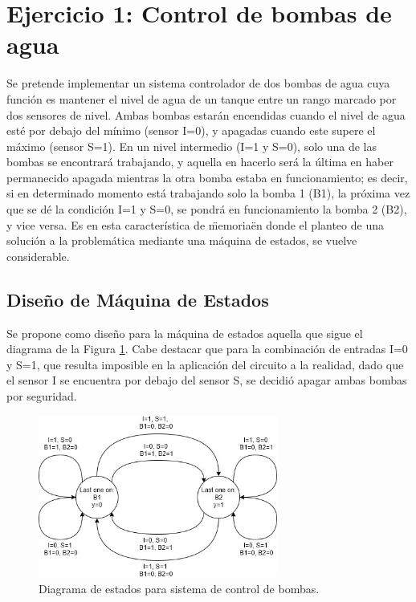 \section{Ejercicio 1: Control de bombas de agua}
Se pretende implementar un sistema controlador de dos bombas de agua cuya función es mantener el nivel de agua de un tanque entre un rango marcado por dos 
sensores de nivel.
Ambas bombas estarán encendidas cuando el nivel de agua esté por debajo del mínimo (sensor I=0), y apagadas cuando este supere el máximo (sensor S=1).
En un nivel intermedio (I=1 y S=0), solo una de las bombas se encontrará trabajando, y aquella en hacerlo será la última en haber permanecido apagada mientras la otra 
bomba estaba en funcionamiento; es decir, si en determinado momento está trabajando solo la bomba 1 (B1), la próxima vez que se dé la condición I=1 y S=0, se pondrá en 
funcionamiento la bomba 2 (B2), y vice versa.
Es en esta característica de \"memoria\" en donde el planteo de una solución a la problemática mediante una máquina de estados, se vuelve considerable.



\subsection{Diseño de Máquina de Estados}
Se propone como diseño para la máquina de estados aquella que sigue el diagrama de la Figura \ref{fig:fsm_state_chart_ex1}.
Cabe destacar que para la combinación de entradas I=0 y S=1, que resulta imposible en la aplicación del circuito a la realidad, dado que el sensor I se encuentra por 
debajo del sensor S, se decidió apagar ambas bombas por seguridad.
\begin{figure}[H]
    \centering
    \includegraphics[width=0.7\textwidth]{../EJ1/Recursos/fsm_state_chart.jpg}
    \caption{Diagrama de estados para sistema de control de bombas.}
    \label{fig:fsm_state_chart_ex1}
\end{figure}

